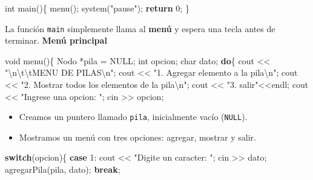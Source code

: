 \documentclass[
  11pt,
  a4paper,
  DIV=11,
  numbers=noendperiod]{scrreprt}
\newenvironment{Shaded}{\begin{snugshade}}{\end{snugshade}}
\newcommand{\ControlFlowTok}[1]{\textcolor[rgb]{0.00,0.23,0.31}{\textbf{#1}}}
\newcommand{\DataTypeTok}[1]{\textcolor[rgb]{0.68,0.00,0.00}{#1}}
\newcommand{\DecValTok}[1]{\textcolor[rgb]{0.68,0.00,0.00}{#1}}
\newcommand{\NormalTok}[1]{\textcolor[rgb]{0.00,0.23,0.31}{#1}}
\newcommand{\OperatorTok}[1]{\textcolor[rgb]{0.37,0.37,0.37}{#1}}
\newcommand{\SpecialCharTok}[1]{\textcolor[rgb]{0.37,0.37,0.37}{#1}}
\newcommand{\StringTok}[1]{\textcolor[rgb]{0.13,0.47,0.30}{#1}}
\begin{document}
\begin{Shaded}
\begin{Highlighting}[]
\DataTypeTok{int}\NormalTok{ main}\OperatorTok{()\{}
\NormalTok{    menu}\OperatorTok{();}
\NormalTok{    system}\OperatorTok{(}\StringTok{"pause"}\OperatorTok{);}
    \ControlFlowTok{return} \DecValTok{0}\OperatorTok{;}
\OperatorTok{\}}
\end{Highlighting}
\end{Shaded}

La función \texttt{main} simplemente llama al \textbf{menú} y espera una
tecla antes de terminar. \textbf{Menú principal}

\begin{Shaded}
\begin{Highlighting}[]
\DataTypeTok{void}\NormalTok{ menu}\OperatorTok{()\{}
\NormalTok{    Nodo }\OperatorTok{*}\NormalTok{pila }\OperatorTok{=}\NormalTok{ NULL}\OperatorTok{;}
    \DataTypeTok{int}\NormalTok{ opcion}\OperatorTok{;}
    \DataTypeTok{char}\NormalTok{ dato}\OperatorTok{;}
    \ControlFlowTok{do}\OperatorTok{\{}
\NormalTok{        cout }\OperatorTok{\textless{}\textless{}} \StringTok{"}\SpecialCharTok{\textbackslash{}n\textbackslash{}t\textbackslash{}t}\StringTok{MENU DE PILAS}\SpecialCharTok{\textbackslash{}n}\StringTok{"}\OperatorTok{;}
\NormalTok{        cout }\OperatorTok{\textless{}\textless{}} \StringTok{"1. Agregar elemento a la pila}\SpecialCharTok{\textbackslash{}n}\StringTok{"}\OperatorTok{;}
\NormalTok{        cout }\OperatorTok{\textless{}\textless{}} \StringTok{"2. Mostrar todos los elementos de la pila}\SpecialCharTok{\textbackslash{}n}\StringTok{"}\OperatorTok{;}
\NormalTok{        cout }\OperatorTok{\textless{}\textless{}} \StringTok{"3. salir"}\OperatorTok{\textless{}\textless{}}\NormalTok{endl}\OperatorTok{;}
\NormalTok{        cout }\OperatorTok{\textless{}\textless{}} \StringTok{"Ingrese una opcion: "}\OperatorTok{;}
\NormalTok{        cin }\OperatorTok{\textgreater{}\textgreater{}}\NormalTok{ opcion}\OperatorTok{;}
\end{Highlighting}
\end{Shaded}

\begin{itemize}
\item
  Creamos un puntero llamado \texttt{pila}, inicialmente vacío
  (\texttt{NULL}).
\item
  Mostramos un menú con tres opciones: agregar, mostrar y salir.
\end{itemize}

\begin{Shaded}
\begin{Highlighting}[]
        \ControlFlowTok{switch}\OperatorTok{(}\NormalTok{opcion}\OperatorTok{)\{}
            \ControlFlowTok{case} \DecValTok{1}\OperatorTok{:}\NormalTok{ cout }\OperatorTok{\textless{}\textless{}} \StringTok{"Digite un caracter: "}\OperatorTok{;}
\NormalTok{                    cin }\OperatorTok{\textgreater{}\textgreater{}}\NormalTok{ dato}\OperatorTok{;}
\NormalTok{                    agregarPila}\OperatorTok{(}\NormalTok{pila}\OperatorTok{,}\NormalTok{ dato}\OperatorTok{);}
                    \ControlFlowTok{break}\OperatorTok{;}
\end{Highlighting}
\end{Shaded}
\end{document}
